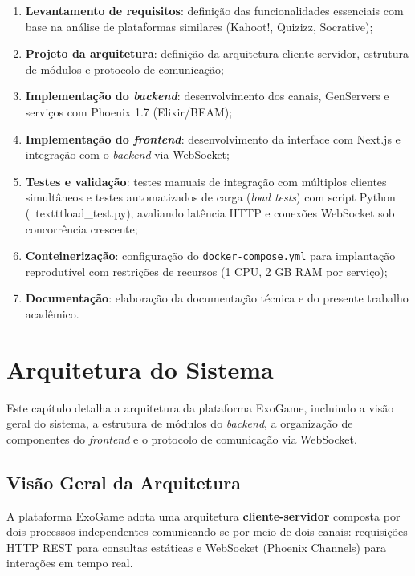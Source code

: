 \documentclass[
	12pt,
	openany,
	oneside,
	a4paper,
	english,
	brazil
]{abntex2}
\begin{document}
\begin{enumerate}
  \item \textbf{Levantamento de requisitos}: definição das funcionalidades essenciais com base na análise de plataformas similares (Kahoot!, Quizizz, Socrative);
  \item \textbf{Projeto da arquitetura}: definição da arquitetura cliente-servidor, estrutura de módulos e protocolo de comunicação;
  \item \textbf{Implementação do \textit{backend}}: desenvolvimento dos canais, GenServers e serviços com Phoenix 1.7 (Elixir/BEAM);
  \item \textbf{Implementação do \textit{frontend}}: desenvolvimento da interface com Next.js e integração com o \textit{backend} via WebSocket;
  \item \textbf{Testes e validação}: testes manuais de integração com múltiplos clientes simultâneos e testes automatizados de carga (\textit{load tests}) com script Python (\ texttt{load\_test.py}), avaliando latência HTTP e conexões WebSocket sob concorrência crescente;
  \item \textbf{Conteinerização}: configuração do \texttt{docker-compose.yml} para implantação reprodutível com restrições de recursos (1 CPU, 2 GB RAM por serviço);
  \item \textbf{Documentação}: elaboração da documentação técnica e do presente trabalho acadêmico.
\end{enumerate}


\chapter{Arquitetura do Sistema}\label{cap:arquitetura}

Este capítulo detalha a arquitetura da plataforma ExoGame, incluindo a visão geral do sistema, a estrutura de módulos do \textit{backend}, a organização de componentes do \textit{frontend} e o protocolo de comunicação via WebSocket.

\section{Visão Geral da Arquitetura}

A plataforma ExoGame adota uma arquitetura \textbf{cliente-servidor} composta por dois processos independentes comunicando-se por meio de dois canais: requisições HTTP REST para consultas estáticas e WebSocket (Phoenix Channels) para interações em tempo real.
\end{document}

